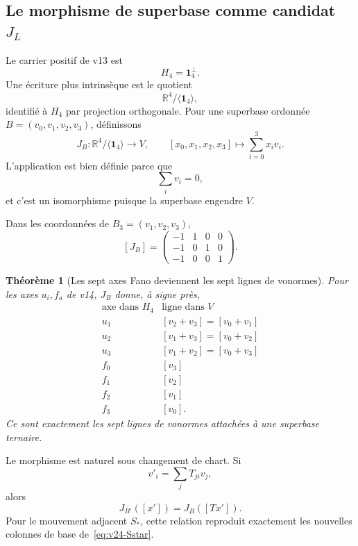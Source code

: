 \documentclass[11pt,a4paper]{article}
\newtheorem{theorem}{Théorème}[section]
\begin{document}
\subsection{Le morphisme de superbase comme candidat \texorpdfstring{$J_L$}{JL}}

Le carrier positif de v13 est
\[
 H_4=\mathbf1_4^\perp.
\]
Une écriture plus intrinsèque est le quotient
\[
 \mathbb R^4/\langle\mathbf1_4\rangle,
\]
identifié à $H_4$ par projection orthogonale. Pour une superbase ordonnée $B=(v_0,v_1,v_2,v_3)$, définissons
\begin{equation}\label{eq:v25-JB}
 \boxed{
 J_B:
 \mathbb R^4/\langle\mathbf1_4\rangle
 \longrightarrow
 V,
 \qquad
 [x_0,x_1,x_2,x_3]
 \longmapsto
 \sum_{i=0}^3x_iv_i.}
\end{equation}
L'application est bien définie parce que
\[
 \sum_i v_i=0,
\]
et c'est un isomorphisme puisque la superbase engendre $V$.

Dans les coordonnées de $B_3=(v_1,v_2,v_3)$,
\begin{equation}\label{eq:v25-Jmatrix}
 \boxed{
 [J_B]
 =
 \begin{pmatrix}
 -1&1&0&0\\
 -1&0&1&0\\
 -1&0&0&1
 \end{pmatrix}.}
\end{equation}

\begin{theorem}[Les sept axes Fano deviennent les sept lignes de vonormes]
Pour les axes $u_i,f_a$ de v14, $J_B$ donne, à signe près,
\begin{equation}\label{eq:v25-seven-vonorm-lines}
 \boxed{
 \begin{array}{c|c}
 \text{axe dans }H_4&\text{ligne dans }V\\
 \hline
 u_1&[v_2+v_3]=[v_0+v_1]\\
 u_2&[v_1+v_3]=[v_0+v_2]\\
 u_3&[v_1+v_2]=[v_0+v_3]\\
 f_0&[v_3]\\
 f_1&[v_2]\\
 f_2&[v_1]\\
 f_3&[v_0].
 \end{array}}
\end{equation}
Ce sont exactement les sept lignes de vonormes attachées à une superbase ternaire.
\end{theorem}

Le morphisme est naturel sous changement de chart. Si
\[
 v'_i=\sum_jT_{ji}v_j,
\]
alors
\begin{equation}\label{eq:v25-J-naturality}
 \boxed{
 J_{B'}([x'])
 =
 J_B([Tx']).}
\end{equation}
Pour le mouvement adjacent $S_*$, cette relation reproduit exactement les nouvelles colonnes de base de~\eqref{eq:v24-Sstar}.
\end{document}
